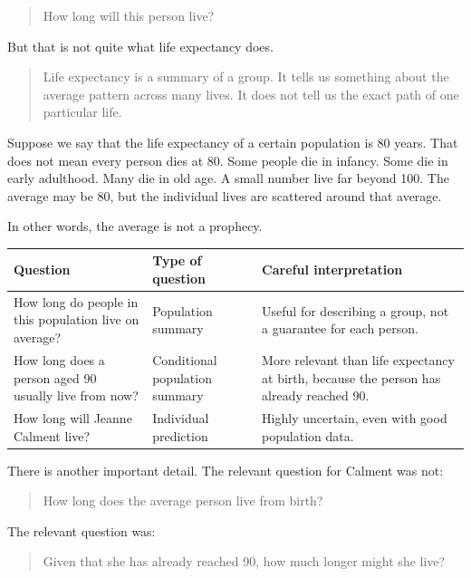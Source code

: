 \documentclass[
  letterpaper,
  DIV=11,
  numbers=noendperiod]{scrreprt}
\begin{document}
\begin{quote}
How long will this person live?
\end{quote}

But that is not quite what life expectancy does.

\begin{quote}
Life expectancy is a summary of a group. It tells us something about the
average pattern across many lives. It does not tell us the exact path of
one particular life.
\end{quote}

Suppose we say that the life expectancy of a certain population is 80
years. That does not mean every person dies at 80. Some people die in
infancy. Some die in early adulthood. Many die in old age. A small
number live far beyond 100. The average may be 80, but the individual
lives are scattered around that average.

In other words, the average is not a prophecy.

\begin{table}
\fontsize{12.0pt}{14.0pt}\selectfont
\begin{tabular*}{\linewidth}{@{\extracolsep{\fill}}lll}
\toprule
Question & Type of question & Careful interpretation \\ 
\midrule\addlinespace[2.5pt]
How long do people in this population live on average? & Population summary & Useful for describing a group, not a guarantee for each person. \\ 
How long does a person aged 90 usually live from now? & Conditional population summary & More relevant than life expectancy at birth, because the person has already reached 90. \\ 
How long will Jeanne Calment live? & Individual prediction & Highly uncertain, even with good population data. \\ 
\bottomrule
\end{tabular*}
\end{table}

There is another important detail. The relevant question for Calment was
not:

\begin{quote}
How long does the average person live from birth?
\end{quote}

The relevant question was:

\begin{quote}
Given that she has already reached 90, how much longer might she live?
\end{quote}
\end{document}
